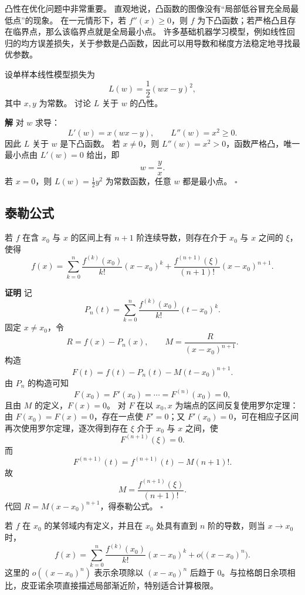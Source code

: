 \documentclass[fontset=fandol]{ctexart}
\newenvironment{proofdetail}{\par\noindent\textbf{证明}\quad}{\hfill$\square$\par\vspace{0.8em}}
\newenvironment{solution}{\par\noindent\textbf{解}\quad}{\hfill$\square$\par\vspace{0.8em}}
\begin{document}
\begin{application}[凸性与机器学习优化]
	凸性在优化问题中非常重要。 直观地说，凸函数的图像没有“局部低谷冒充全局最低点”的现象。 在一元情形下，若 $f''(x)\ge0$，则 $f$ 为下凸函数；若严格凸且存在临界点，那么该临界点就是全局最小点。 许多基础机器学习模型，例如线性回归的均方误差损失，关于参数是凸函数，因此可以用导数和梯度方法稳定地寻找最优参数。
	
	\begin{example}
		设单样本线性模型损失为
		\[
		L(w)=\frac12(wx-y)^2,
		\]
		其中 $x,y$ 为常数。 讨论 $L$ 关于 $w$ 的凸性。
	\end{example}
	\begin{solution}
		对 $w$ 求导：
		\[
		L'(w)=x(wx-y),\qquad L''(w)=x^2\ge0.
		\]
		因此 $L$ 关于 $w$ 是下凸函数。 若 $x\neq0$，则 $L''(w)=x^2>0$，函数严格凸，唯一最小点由 $L'(w)=0$ 给出，即
		\[
		w=\frac{y}{x}.
		\]
		若 $x=0$，则 $L(w)=\frac12y^2$ 为常数函数，任意 $w$ 都是最小点。
	\end{solution}
	
\end{application}




\subsection{泰勒公式}

\begin{theorem}
若 $f$ 在含 $x_0$ 与 $x$ 的区间上有 $n+1$ 阶连续导数，则存在介于 $x_0$ 与 $x$ 之间的 $\xi$，使得
\[
f(x)=\sum_{k=0}^{n}\frac{f^{(k)}(x_0)}{k!}(x-x_0)^k
+\frac{f^{(n+1)}(\xi)}{(n+1)!}(x-x_0)^{n+1}.
\]
\end{theorem}
\begin{proofdetail}
记
\[
P_n(t)=\sum_{k=0}^{n}\frac{f^{(k)}(x_0)}{k!}(t-x_0)^k.
\]
固定 $x\neq x_0$，令
\[
R=f(x)-P_n(x),\qquad
M=\frac{R}{(x-x_0)^{n+1}}.
\]
构造
\[
F(t)=f(t)-P_n(t)-M(t-x_0)^{n+1}.
\]
由 $P_n$ 的构造可知
\[
F(x_0)=F'(x_0)=\cdots=F^{(n)}(x_0)=0,
\]
且由 $M$ 的定义，$F(x)=0$。 对 $F$ 在以 $x_0,x$ 为端点的区间反复使用罗尔定理：由 $F(x_0)=F(x)=0$，存在一点使 $F'=0$；又 $F'(x_0)=0$，可在相应子区间再次使用罗尔定理，逐次得到存在 $\xi$ 介于 $x_0$ 与 $x$ 之间，使
\[
F^{(n+1)}(\xi)=0.
\]
而
\[
F^{(n+1)}(t)=f^{(n+1)}(t)-M(n+1)!.
\]
故
\[
M=\frac{f^{(n+1)}(\xi)}{(n+1)!}.
\]
代回 $R=M(x-x_0)^{n+1}$，得泰勒公式。
\end{proofdetail}

\begin{theorem}
若 \(f\) 在 \(x_0\) 的某邻域内有定义，并且在 \(x_0\) 处具有直到 \(n\) 阶的导数，则当 \(x\to x_0\) 时，
\[
f(x)=\sum_{k=0}^{n}\frac{f^{(k)}(x_0)}{k!}(x-x_0)^k
+o\bigl((x-x_0)^n\bigr).
\]
这里的 \(o((x-x_0)^n)\) 表示余项除以 \((x-x_0)^n\) 后趋于 \(0\)。与拉格朗日余项相比，皮亚诺余项直接描述局部渐近阶，特别适合计算极限。
\end{theorem}
\end{document}
